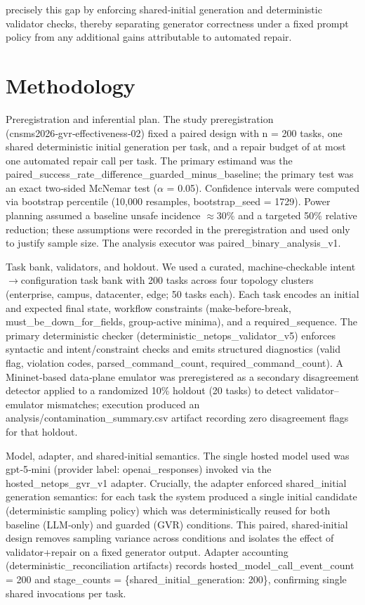 \documentclass[conference]{IEEEtran}
\begin{document}
precisely this gap by enforcing shared‑initial generation and deterministic validator checks, thereby separating generator correctness under a fixed prompt policy from any additional gains attributable to automated repair.

\section{Methodology}
Preregistration and inferential plan. The study preregistration (cnsms2026‑gvr‑effectiveness‑02) fixed a paired design with n = 200 tasks, one shared deterministic initial generation per task, and a repair budget of at most one automated repair call per task. The primary estimand was the paired\_success\_rate\_difference\_guarded\_minus\_baseline; the primary test was an exact two‑sided McNemar test (\ensuremath{\alpha} = 0.05). Confidence intervals were computed via bootstrap percentile (10,000 resamples, bootstrap\_seed = 1729). Power planning assumed a baseline unsafe incidence \ensuremath{\approx}30\% and a targeted 50\% relative reduction; these assumptions were recorded in the preregistration and used only to justify sample size. The analysis executor was paired\_binary\_analysis\_v1.

Task bank, validators, and holdout. We used a curated, machine‑checkable intent\ensuremath{\rightarrow}configuration task bank with 200 tasks across four topology clusters (enterprise, campus, datacenter, edge; 50 tasks each). Each task encodes an initial and expected final state, workflow constraints (make‑before‑break, must\_be\_down\_for\_fields, group‑active minima), and a required\_sequence. The primary deterministic checker (deterministic\_netops\_validator\_v5) enforces syntactic and intent/constraint checks and emits structured diagnostics (valid flag, violation codes, parsed\_command\_count, required\_command\_count). A Mininet‑based data‑plane emulator was preregistered as a secondary disagreement detector applied to a randomized 10\% holdout (20 tasks) to detect validator--emulator mismatches; execution produced an analysis/contamination\_summary.csv artifact recording zero disagreement flags for that holdout.

Model, adapter, and shared‑initial semantics. The single hosted model used was gpt‑5‑mini (provider label: openai\_responses) invoked via the hosted\_netops\_gvr\_v1 adapter. Crucially, the adapter enforced shared\_initial generation semantics: for each task the system produced a single initial candidate (deterministic sampling policy) which was deterministically reused for both baseline (LLM‑only) and guarded (GVR) conditions. This paired, shared‑initial design removes sampling variance across conditions and isolates the effect of validator+repair on a fixed generator output. Adapter accounting (deterministic\_reconciliation artifacts) records hosted\_model\_call\_event\_count = 200 and stage\_counts = \{shared\_initial\_generation: 200\}, confirming single shared invocations per task.
\end{document}
